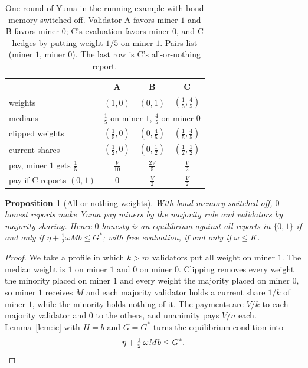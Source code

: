 \documentclass[sigconf,anonymous,review]{acmart}
\numberwithin{equation}{section}
\newtheorem{proposition}[theorem]{Proposition}
\newcommand{\Gs}{G^{*}}
\begin{document}
\begin{table}[t]
\caption{One round of Yuma in the running example with bond memory switched
off. Validator A favors miner $1$ and B favors miner $0$; C's evaluation favors
miner $0$, and C hedges by putting weight $1/5$ on miner $1$. Pairs list
(miner $1$, miner $0$). The last row is C's all-or-nothing report.}
\label{tab:round}
\small
\begin{tabular}{@{}lccc@{}}
\toprule
& A & B & C \\
\midrule
weights & $(1,0)$ & $(0,1)$ & $(\frac15,\frac45)$ \\
medians & \multicolumn{3}{c}{$\frac15$ on miner $1$, $\frac45$ on miner $0$} \\
clipped weights & $(\frac15,0)$ & $(0,\frac45)$ & $(\frac15,\frac45)$ \\
current shares & $(\frac12,0)$ & $(0,\frac12)$ & $(\frac12,\frac12)$ \\
pay, miner $1$ gets $\frac15$ & $\frac{V}{10}$ & $\frac{2V}{5}$ & $\frac V2$ \\
\addlinespace
pay if C reports $(0,1)$ & $0$ & $\frac V2$ & $\frac V2$ \\
\bottomrule
\end{tabular}
\end{table}

\begin{proposition}[All-or-nothing weights]\label{prop:binary}
With bond memory switched off, $0$-honest reports make Yuma pay miners by the
majority rule and validators by majority sharing. Hence $0$-honesty is an
equilibrium against all reports in $\{0,1\}$ if and only if
$\eta+\frac12\omega Mb\le\Gs$; with free evaluation, if and only if
$\omega\le K$.
\end{proposition}

\begin{proof}
We take a profile in which $k>m$ validators put all weight on miner $1$. The
median weight is $1$ on miner $1$ and $0$ on miner $0$. Clipping removes every
weight the minority placed on miner $1$ and every weight the majority placed on
miner $0$, so miner $1$ receives $M$ and each majority validator holds a
current share $1/k$ of miner $1$, while the minority holds nothing of it. The
payments are $V/k$ to each majority validator and $0$ to the others, and
unanimity pays $V/n$ each. Lemma~\ref{lem:ic} with $H=b$ and $G=\Gs$ turns the
equilibrium condition into
\[
\eta+\tfrac12\,\omega Mb\le\Gs .\qedhere
\]
\end{proof}
\end{document}
